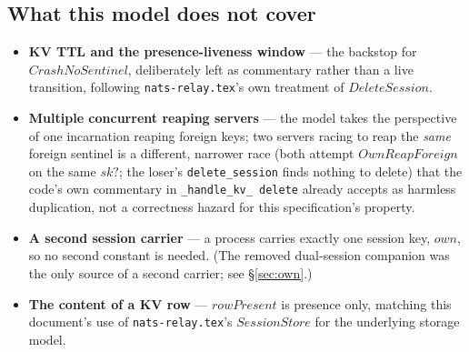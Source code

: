 \documentclass[a4paper,10pt,fleqn]{article}
\begin{document}
\subsection{What this model does not cover}

\begin{itemize}
  \item \textbf{KV TTL and the presence-liveness window} --- the
    backstop for $CrashNoSentinel$, deliberately left as commentary
    rather than a live transition, following \texttt{nats-relay.tex}'s
    own treatment of $DeleteSession$.
  \item \textbf{Multiple concurrent reaping servers} --- the model
    takes the perspective of one incarnation reaping foreign keys; two
    servers racing to reap the \emph{same} foreign sentinel is a
    different, narrower race (both attempt $OwnReapForeign$ on the same
    $sk?$; the loser's \texttt{delete\_session} finds nothing to
    delete) that the code's own commentary in \texttt{\_handle\_kv\_
    delete} already accepts as harmless duplication, not a correctness
    hazard for this specification's property.
  \item \textbf{A second session carrier} --- a process carries exactly
    one session key, $own$, so no second constant is needed.  (The removed
    dual-session companion was the only source of a second carrier;
    see \S\ref{sec:own}.)
  \item \textbf{The content of a KV row} --- $rowPresent$ is presence
    only, matching this document's use of \texttt{nats-relay.tex}'s
    $SessionStore$ for the underlying storage model.
\end{itemize}
\end{document}
